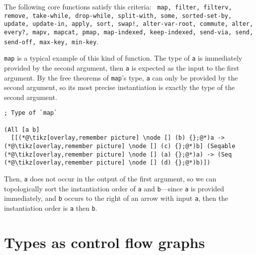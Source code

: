 \documentclass[9pt]{extarticle}
\begin{document}
The following core functions satisfy this criteria: \texttt{
map, filter, filterv, remove, take-while, drop-while, split-with, some, sorted-set-by,
update, update-in, apply, sort, swap!, alter-var-root, commute, alter, every?, mapv,
mapcat, pmap, map-indexed, keep-indexed, send-via, send, send-off, max-key, min-key}.

\texttt{map} is a typical example of this kind of function. The type of \texttt{a} is immediately
provided by the second argument, then \texttt{a} is expected as the input to the first argument.
By the free theorems of \texttt{map}'s type, \texttt{a} can only be provided by the second argument, so
its most precise instantiation is exactly the type of the second argument.

\begin{lstlisting}
; Type of `map`

(All [a b]
  [[(*@\tikz[overlay,remember picture] \node [] (b) {};@*)a -> (*@\tikz[overlay,remember picture] \node [] (c) {};@*)b] (Seqable (*@\tikz[overlay,remember picture] \node [] (a) {};@*)a) -> (Seq (*@\tikz[overlay,remember picture] \node [] (d) {};@*)b)])
\end{lstlisting}

Then, \texttt{a} does not occur in the output of the first argument, so we can topologically sort
the instantiation order of \texttt{a} and \texttt{b}---since \texttt{a} is provided immediately, and
\texttt{b} occurs to the right of an arrow with input \texttt{a}, then the instantiation
order is \texttt{a} then \texttt{b}.

\section{Types as control flow graphs}

%
\end{document}
